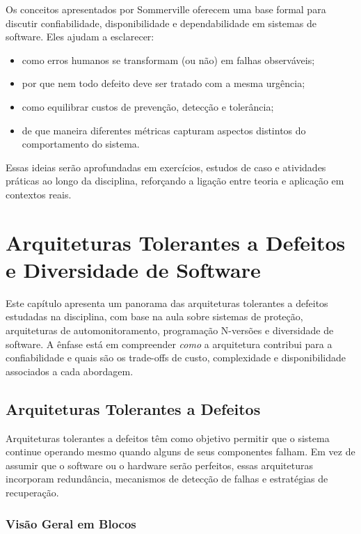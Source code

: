 \documentclass[12pt,a4paper,twoside]{report}
\begin{document}
Os conceitos apresentados por Sommerville oferecem uma base formal para
discutir confiabilidade, disponibilidade e dependabilidade em sistemas de
software. Eles ajudam a esclarecer:
\begin{itemize}[nosep]
    \item como erros humanos se transformam (ou não) em falhas observáveis;
    \item por que nem todo defeito deve ser tratado com a mesma urgência;
    \item como equilibrar custos de prevenção, detecção e tolerância;
    \item de que maneira diferentes métricas capturam aspectos distintos do
    comportamento do sistema.
\end{itemize}

Essas ideias serão aprofundadas em exercícios, estudos de caso e atividades
práticas ao longo da disciplina, reforçando a ligação entre teoria e
aplicação em contextos reais.

\clearpage

\chapter{Arquiteturas Tolerantes a Defeitos e Diversidade de Software}

Este capítulo apresenta um panorama das arquiteturas tolerantes a defeitos
estudadas na disciplina, com base na aula sobre sistemas de proteção,
arquiteturas de automonitoramento, programação N-versões e diversidade de
software. A ênfase está em compreender \emph{como} a arquitetura contribui
para a confiabilidade e quais são os trade-offs de custo, complexidade e
disponibilidade associados a cada abordagem.

\section{Arquiteturas Tolerantes a Defeitos}

Arquiteturas tolerantes a defeitos têm como objetivo permitir que o sistema
continue operando mesmo quando alguns de seus componentes falham. Em vez de
assumir que o software ou o hardware serão perfeitos, essas arquiteturas
incorporam redundância, mecanismos de detecção de falhas e estratégias de
recuperação.

\subsection{Visão Geral em Blocos}
\end{document}
